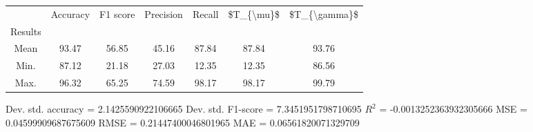 \begin{tabular}{|c|c|c|c|c|c|c|}
\toprule
{} &  Accuracy &  F1 score &  Precision &  Recall &  \$T\_\{\textbackslash mu\}\$ &  \$T\_\{\textbackslash gamma\}\$ \\
Results &           &           &            &         &            &               \\
\hline
Mean    &     93.47 &     56.85 &      45.16 &   87.84 &      87.84 &         93.76 \\
Min.    &     87.12 &     21.18 &      27.03 &   12.35 &      12.35 &         86.56 \\
Max.    &     96.32 &     65.25 &      74.59 &   98.17 &      98.17 &         99.79 \\
\bottomrule
\end{tabular}

 Dev. std. accuracy = 2.1425590922106665
 Dev. std. F1-score = 7.3451951798710695
 $R^2$ = -0.0013252363932305666
 MSE = 0.04599909687675609
 RMSE = 0.21447400046801965
 MAE = 0.06561820071329709